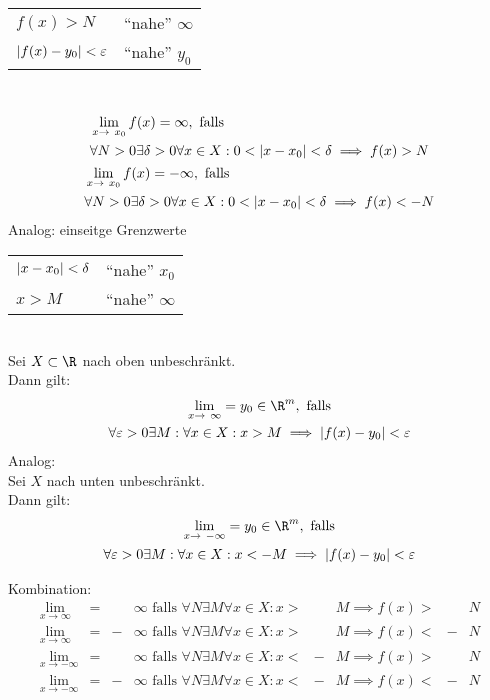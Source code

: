 \begin{def*}[note = uneigentlicher Grenzwert , index = Grenzwert!uneigentlicher]
	\begin{tabular}{ll}
		$f(x) > N$					&\enquote{nahe} $\infty$	\\
		$\abs{f(x) - y_0} < \varepsilon$	&\enquote{nahe} $y_0$	
	\end{tabular}\\
	\begin{gather*}
		\begin{split}
			&\lim_{x \rightarrow x_0} f(x) = \infty, \text{ falls } \\
			&\forall N > 0 \exists \delta > 0 \forall x \in X : 0 < \abs{x-x_0} < \delta \implies f(x) > N
		\end{split} \\
		\begin{split}
			&\lim_{x \rightarrow x_0} f(x) = -\infty, \text{ falls } \\
			&\forall N > 0 \exists \delta > 0 \forall x \in X : 0 < \abs{x-x_0} < \delta \implies f(x) < -N
		\end{split}
	\end{gather*}
	Analog: einseitge Grenzwerte
\end{def*}
\begin{def*}
	\begin{tabular}{ll}
		$\abs{x-x_0} < \delta$	&\enquote{nahe} $x_0$	\\
		$x > M$				&\enquote{nahe} $\infty$	
	\end{tabular}\\
	Sei $X \subset \R$ nach oben unbeschränkt. \\
	Dann gilt:
	\begin{gather*}
		\lim_{x \rightarrow \infty} = y_0 \in \R^m , \text{ falls} \\
		\forall \epsilon > 0 \exists M : \forall x \in X : x > M \implies \abs{f(x) - y_0} < \epsilon
	\end{gather*}
	Analog: \\
	Sei $X$ nach unten unbeschränkt. \\
	Dann gilt:
	\begin{gather*}
		\lim_{x \rightarrow -\infty} = y_0 \in \R^m , \text{ falls} \\
		\forall \epsilon > 0 \exists M : \forall x \in X : x < -M \implies \abs{f(x) - y_0} < \epsilon
	\end{gather*}
	
	Kombination:\\
	\begin{align*}
		\lim_{x \rightarrow \infty}	&=	&	&\infty \text{ falls } \forall N \exists M \forall x \in X : x >	&	&M \implies f(x) >	&	&N \\
		\lim_{x \rightarrow \infty}	&=	&- 	&\infty \text{ falls } \forall N \exists M \forall x \in X : x >	&	&M \implies f(x) <	&-	&N \\
		\lim_{x \rightarrow -\infty}	&=	&	&\infty \text{ falls } \forall N \exists M \forall x \in X : x <	&-	&M \implies f(x) >	&	&N \\
		\lim_{x \rightarrow -\infty}	&=	&-	&\infty \text{ falls } \forall N \exists M \forall x \in X : x <	&-	&M \implies f(x) <	&-	&N 
	\end{align*}
\end{def*}
